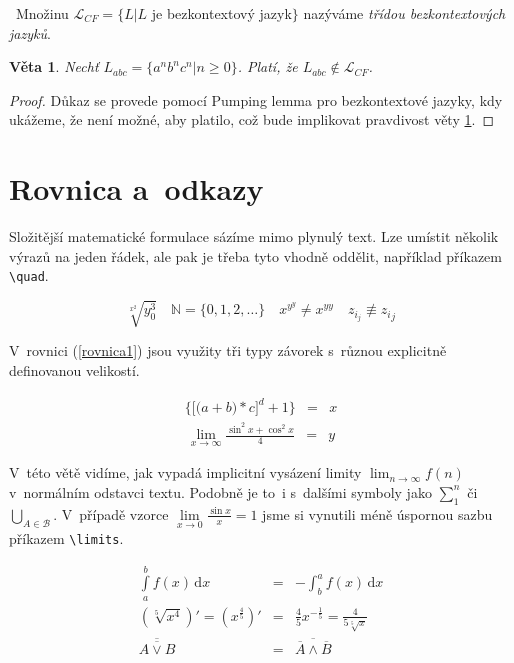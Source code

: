 \documentclass[a4paper,11pt,twocolumn,titlepage]{article}[11.3.2016]
\begin{document}
\begin{definicia}\ \textup{Množinu $\mathcal{L}_{CF} = \{L | L$ je bezkontextový jazyk$\}$ nazýváme \textsl{třídou bezkontextových jazyků}.}
\end{definicia}

\newtheorem{veta}{Věta}

\begin{veta} \textsl{Nechť} $L_{abc} = \{ a^n b^n c^n | n \geq 0 \}$. \textsl{Platí, že} $L_{abc} \not\in \mathcal{L}_{CF}$. \label{veta1}
\end{veta}

\begin{proof}
Důkaz se provede pomocí Pumping lemma pro bezkontextové jazyky, kdy ukážeme, že není možné, aby platilo, což bude implikovat pravdivost věty \ref{veta1}.
\end{proof}

\section{Rovnica a~odkazy}

Složitější matematické formulace sázíme mimo plynulý text. Lze umístit několik výrazů na jeden řádek, ale pak je třeba tyto vhodně oddělit, například pří\-kazem \verb|\quad|.

$$\sqrt[x^2]{y^3_0} \quad \mathbb{N} = \{0,1,2,\ldots \} \quad x^{y^y} \neq x^{yy} \quad z_{i_j} \not\equiv {z_i}_j$$

V~rovnici (\ref{rovnica1}) jsou využity tři typy závorek s~rů\-znou explicitně definovanou velikostí.

\begin{eqnarray}
 \bigg\{\Big[\big(a + b\big) * c\Big]^d +1\bigg\}& = & x\label{rovnica1}
\end{eqnarray}
\vspace{-2em}
\begin{eqnarray*}
\lim_{x \to \infty}\frac{\sin ^2 x + \cos^2 x}{4} &=& y
\end{eqnarray*}

V~této větě vidíme, jak vypadá implicitní vysázení limity $\lim_{n \to \infty}f(n)$ v~normálním odstavci textu. Podobně je to~i s~dalšími symboly jako $\sum_1^n$ či $\bigcup_{A\in \mathcal{B}}$. V~případě vzorce $\lim\limits_{x \to 0}\frac{\sin x}{x}=1$ jsme si vynutili méně úspornou sazbu příkazem \verb|\limits|.

\begin{eqnarray}
\int\limits_a^b f(x)\,\mathrm{d}x &=& -\int_b^a f(x)\,\mathrm{d}x  \\
\left(\sqrt[5]{x^4}\right)' = \left(x^{\frac{4}{5}}\right)' &=& \frac{4}{5}x^{-\frac{1}{5}} = \frac{4}{5\sqrt[5]{x}}\\
\overline{\overline{A \vee B}} &=& \overline{\overline{A} \wedge \overline{B}}
\end{eqnarray}
\end{document}
